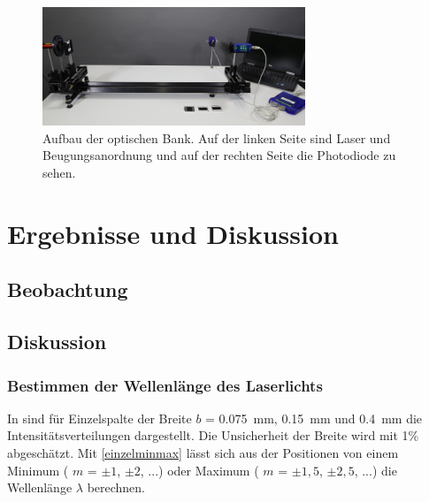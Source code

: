 \documentclass[
	a4paper,
	12pt,
	pagesize,
	ngerman
]{scrartcl}
\begin{document}
	\begin{figure}[H]
		\includegraphics[width=0.7\textwidth]{optischeBank}
		\centering
		\caption{Aufbau der optischen Bank. Auf der linken Seite sind Laser und Beugungsanordnung und auf der rechten Seite die Photodiode zu sehen.\cite{optischeBank} }
		\label{optischeBank}
		\centering
	\end{figure} 
	
	\section{Ergebnisse und Diskussion}
	

	\subsection{Beobachtung}
	

	\subsection{Diskussion}
	
	\subsubsection{Bestimmen der Wellenlänge des Laserlichts}
	In  sind für Einzelspalte der Breite $b$ = \SI{0,075}{mm}, \SI{0,15}{mm} und \SI{0,4}{mm} die Intensitätsverteilungen dargestellt. 
	Die Unsicherheit der Breite wird mit 1\% abgeschätzt. %
	Mit \cref{einzelminmax} lässt sich aus der Positionen von einem Minimum ( $m$ = $\pm1$, $\pm 2$, ...) oder Maximum ( $m$ = $\pm1,5$, $\pm 2,5$, ...) die Wellenlänge $\lambda$ berechnen. 
	
\end{document}
